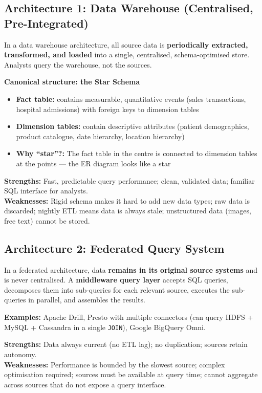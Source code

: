 \documentclass[12pt,a4paper]{article}
\begin{document}
\subsection{Architecture 1: Data Warehouse (Centralised, Pre-Integrated)}

In a data warehouse architecture, all source data is \textbf{periodically extracted, transformed, and loaded} into a single, centralised, schema-optimised store.  Analysts query the warehouse, not the sources.

\textbf{Canonical structure: the Star Schema}
\begin{itemize}[leftmargin=1.8em]
  \item \textbf{Fact table:} contains measurable, quantitative events (sales transactions, hospital admissions) with foreign keys to dimension tables
  \item \textbf{Dimension tables:} contain descriptive attributes (patient demographics, product catalogue, date hierarchy, location hierarchy)
  \item \textbf{Why ``star''?:} The fact table in the centre is connected to dimension tables at the points --- the ER diagram looks like a star
\end{itemize}

\textbf{Strengths:} Fast, predictable query performance; clean, validated data; familiar SQL interface for analysts.\\
\textbf{Weaknesses:} Rigid schema makes it hard to add new data types; raw data is discarded; nightly ETL means data is always stale; unstructured data (images, free text) cannot be stored.

\subsection{Architecture 2: Federated Query System}

In a federated architecture, data \textbf{remains in its original source systems} and is never centralised.  A \textbf{middleware query layer} accepts SQL queries, decomposes them into sub-queries for each relevant source, executes the sub-queries in parallel, and assembles the results.

\textbf{Examples:} Apache Drill, Presto with multiple connectors (can query HDFS + MySQL + Cassandra in a single \texttt{JOIN}), Google BigQuery Omni.

\textbf{Strengths:} Data always current (no ETL lag); no duplication; sources retain autonomy.\\
\textbf{Weaknesses:} Performance is bounded by the slowest source; complex optimisation required; sources must be available at query time; cannot aggregate across sources that do not expose a query interface.
\end{document}
